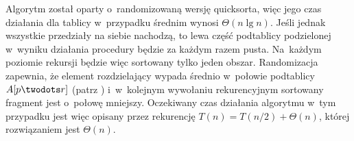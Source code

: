\subproblem %
Algorytm został oparty o~randomizowaną wersję quicksorta, więc jego czas działania dla tablicy  w~przypadku średnim wynosi $\Theta(n\lg n)$. Jeśli jednak wszystkie przedziały na siebie nachodzą, to lewa część podtablicy podzielonej w~wyniku działania procedury  będzie za każdym razem pusta. Na~każdym poziomie rekursji będzie więc sortowany tylko jeden obszar. Randomizacja zapewnia, że element rozdzielający wypada średnio w~połowie podtablicy $A[p\twodots r]$ (patrz ) i~w~kolejnym wywołaniu rekurencyjnym sortowany fragment jest o~połowę mniejszy. Oczekiwany czas działania algorytmu w~tym przypadku jest więc opisany przez rekurencję $T(n)=T(n/2)+\Theta(n)$, której rozwiązaniem jest $\Theta(n)$.

\endinput
